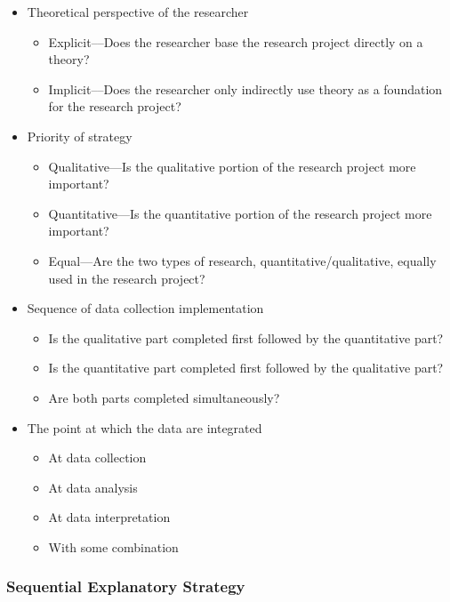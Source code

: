 \begin{itemize}
	\item Theoretical perspective of the researcher
	\begin{itemize}
		\item Explicit–--Does the researcher base the research project directly on a theory?
		\item Implicit–--Does the researcher only indirectly use theory as a foundation for the research project?
	\end{itemize}

	\item Priority of strategy
	\begin{itemize}
		\item Qualitative---Is the qualitative portion of the research project more important?
		\item Quantitative---Is the quantitative portion of the research project more important?
		\item Equal---Are the two types of research, quantitative/qualitative, equally used in the research project?
	\end{itemize}

	\item Sequence of data collection implementation
	\begin{itemize}
		\item Is the qualitative part completed first followed by the quantitative part?
		\item Is the quantitative part completed first followed by the qualitative part?
		\item Are both parts completed simultaneously?
	\end{itemize}

	\item The point at which the data are integrated
	\begin{itemize}
		\item At data collection
		\item At data analysis
		\item At data interpretation
		\item With some combination
	\end{itemize}
\end{itemize}

\subsubsection{Sequential Explanatory Strategy}

